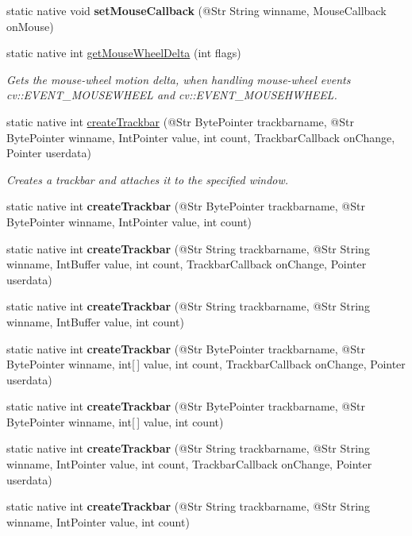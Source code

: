 \begin{DoxyCompactItemize}
static native void {\bfseries set\+Mouse\+Callback} (@Str String winname, Mouse\+Callback on\+Mouse)
\item 
static native int \hyperlink{group__highgui_gaf78c2cffa388987b42b78f0c122e5ef9}{get\+Mouse\+Wheel\+Delta} (int flags)
\begin{DoxyCompactList}\small\item\em Gets the mouse-\/wheel motion delta, when handling mouse-\/wheel events cv\+::\+E\+V\+E\+N\+T\+\_\+\+M\+O\+U\+S\+E\+W\+H\+E\+EL and cv\+::\+E\+V\+E\+N\+T\+\_\+\+M\+O\+U\+S\+E\+H\+W\+H\+E\+EL. \end{DoxyCompactList}\item 
static native int \hyperlink{group__highgui_ga727bcca32e6bc9d52ae86894538318fa}{create\+Trackbar} (@Str Byte\+Pointer trackbarname, @Str Byte\+Pointer winname, Int\+Pointer value, int count, Trackbar\+Callback on\+Change, Pointer userdata)
\begin{DoxyCompactList}\small\item\em Creates a trackbar and attaches it to the specified window. \end{DoxyCompactList}\item 
static native int {\bfseries create\+Trackbar} (@Str Byte\+Pointer trackbarname, @Str Byte\+Pointer winname, Int\+Pointer value, int count)
\item 
static native int {\bfseries create\+Trackbar} (@Str String trackbarname, @Str String winname, Int\+Buffer value, int count, Trackbar\+Callback on\+Change, Pointer userdata)
\item 
static native int {\bfseries create\+Trackbar} (@Str String trackbarname, @Str String winname, Int\+Buffer value, int count)
\item 
static native int {\bfseries create\+Trackbar} (@Str Byte\+Pointer trackbarname, @Str Byte\+Pointer winname, int\mbox{[}$\,$\mbox{]} value, int count, Trackbar\+Callback on\+Change, Pointer userdata)
\item 
static native int {\bfseries create\+Trackbar} (@Str Byte\+Pointer trackbarname, @Str Byte\+Pointer winname, int\mbox{[}$\,$\mbox{]} value, int count)
\item 
static native int {\bfseries create\+Trackbar} (@Str String trackbarname, @Str String winname, Int\+Pointer value, int count, Trackbar\+Callback on\+Change, Pointer userdata)
\item 
static native int {\bfseries create\+Trackbar} (@Str String trackbarname, @Str String winname, Int\+Pointer value, int count)
\item 

\end{DoxyCompactItemize}
